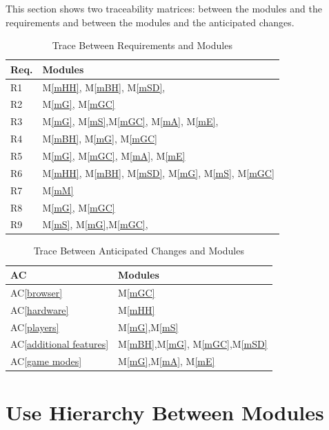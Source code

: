 \documentclass[12pt, titlepage]{article}
\newcommand{\acref}[1]{AC\ref{#1}}
\newcommand{\mref}[1]{M\ref{#1}}
\begin{document}
This section shows two traceability matrices: between the modules and the
requirements and between the modules and the anticipated changes.


\begin{table}[H]
\centering
\begin{tabular}{p{} p{}}
\toprule
\textbf{Req.} & \textbf{Modules}\\
\midrule
R1 & \mref{mHH}, \mref{mBH}, \mref{mSD}, \\
R2 & \mref{mG}, \mref{mGC}\\
R3 & \mref{mG}, \mref{mS},\mref{mGC}, \mref{mA}, \mref{mE},\\
R4 & \mref{mBH}, \mref{mG}, \mref{mGC}\\
R5 & \mref{mG}, \mref{mGC}, \mref{mA}, \mref{mE}\\
R6 & \mref{mHH}, \mref{mBH}, \mref{mSD}, \mref{mG}, \mref{mS}, \mref{mGC}\\
R7 & \mref{mM}\\
R8 & \mref{mG}, \mref{mGC}\\
R9 & \mref{mS}, \mref{mG},\mref{mGC},\\
\bottomrule
\end{tabular}
\caption{Trace Between Requirements and Modules}
\label{TblRT}
\end{table}
\begin{table}[H]
\centering
\begin{tabular}{p{} p{}}
\toprule
\textbf{AC} & \textbf{Modules}\\
\midrule
\acref{browser} &\mref{mGC}\\
\acref{hardware} & \mref{mHH}\\
\acref{players} & \mref{mG},\mref{mS} \\
\acref{additional features} & \mref{mBH},\mref{mG}, \mref{mGC},\mref{mSD}\\
\acref{game modes} &\mref{mG},\mref{mA}, \mref{mE}\\
\bottomrule
\end{tabular}
\caption{Trace Between Anticipated Changes and Modules}
\label{TblACT}
\end{table}

\section{Use Hierarchy Between Modules} \label{SecUse}
\end{document}
